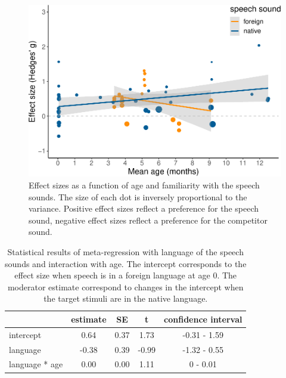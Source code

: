 \documentclass[
  man,mask,floatsintext]{apa6}
\begin{document}
\begin{figure}
\centering
\includegraphics{MA_speech_pref_files/figure-latex/lang-1.pdf}
\caption{\label{fig:lang}Effect sizes as a function of age and familiarity with the speech sounds. The size of each dot is inversely proportional to the variance. Positive effect sizes reflect a preference for the speech sound, negative effect sizes reflect a preference for the competitor sound.}
\end{figure}

\begin{table}[tbp]

\begin{center}
\begin{threeparttable}

\caption{\label{tab:TableLang}Statistical results of meta-regression with language of the speech sounds and interaction with age. The intercept corresponds to the effect size when speech is in a foreign language at age 0. The moderator estimate correspond to changes in the intercept when the target stimuli are in the native language.}

\begin{tabular}{lcccc}
\toprule
 & estimate & SE & t & confidence interval\\
\midrule
intercept & 0.64 & 0.37 & 1.73 & -0.31 - 1.59\\
language & -0.38 & 0.39 & -0.99 & -1.32 - 0.55\\
language * age & 0.00 & 0.00 & 1.11 & 0 - 0.01\\
\bottomrule
\end{tabular}

\end{threeparttable}
\end{center}

\end{table}
\end{document}
